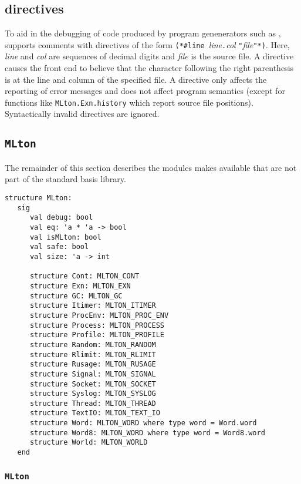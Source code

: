 
\subsection{{\nline} directives}
To aid in the debugging of code produced by program genenerators such as
,
{\mlton} supports comments with {\nline} directives of the form {\tt (*\#line
}{\it line}{\tt.}{\it col} {\tt "}{\it file}{\tt"*)}.  Here, {\it line} and {\it
col} are sequences of decimal digits and {\it file} is the source file.  A
{\nline} directive causes the front end to believe that the character following
the right parenthesis is at the line and column of the specified file.  A
{\nline} directive only affects the reporting of error messages and does not
affect program semantics (except for functions like {\tt MLton.Exn.history}
which report source file positions).  Syntactically invalid {\nline} directives
are ignored.

\subsection{{\tt MLton}}

The remainder of this section describes the modules {\mlton} makes available
that are not part of the standard basis library.

\begin{verbatim}
structure MLton:
   sig
      val debug: bool
      val eq: 'a * 'a -> bool
      val isMLton: bool
      val safe: bool
      val size: 'a -> int
         
      structure Cont: MLTON_CONT
      structure Exn: MLTON_EXN
      structure GC: MLTON_GC
      structure Itimer: MLTON_ITIMER
      structure ProcEnv: MLTON_PROC_ENV
      structure Process: MLTON_PROCESS
      structure Profile: MLTON_PROFILE
      structure Random: MLTON_RANDOM
      structure Rlimit: MLTON_RLIMIT
      structure Rusage: MLTON_RUSAGE
      structure Signal: MLTON_SIGNAL
      structure Socket: MLTON_SOCKET
      structure Syslog: MLTON_SYSLOG
      structure Thread: MLTON_THREAD
      structure TextIO: MLTON_TEXT_IO
      structure Word: MLTON_WORD where type word = Word.word
      structure Word8: MLTON_WORD where type word = Word8.word
      structure World: MLTON_WORLD
   end
\end{verbatim}

\subsubsection{{\tt MLton}}

